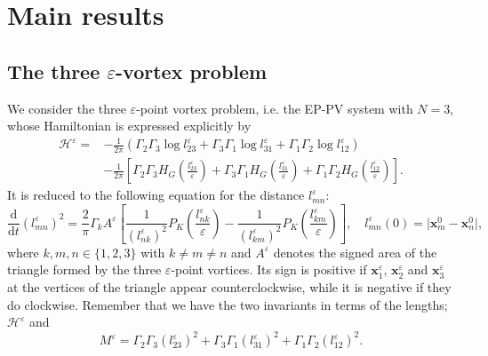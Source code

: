 \documentclass{article}
\theoremstyle{definition}
\begin{document}

\section{Main results}
\subsection{The three $\varepsilon$-vortex problem}
\label{three-vortex}

We consider the three $\varepsilon$-point vortex problem, i.e. the EP-PV system with $N=3$, whose Hamiltonian is expressed explicitly by
\begin{align*}
\mathscr{H}^\varepsilon = & -\frac{1}{2\pi} \left( \Gamma_2 \Gamma_3 \log l_{23}^\varepsilon + \Gamma_3 \Gamma_1 \log l_{31}^\varepsilon + \Gamma_1 \Gamma_2 \log l_{12}^\varepsilon \right) \\ 
& - \frac{1}{2\pi} \left[ \Gamma_2 \Gamma_3 H_G\left( \frac{l_{23}^\varepsilon}{\varepsilon} \right) + \Gamma_3 \Gamma_1 H_G\left( \frac{l_{31}^\varepsilon}{\varepsilon} \right) + \Gamma_1 \Gamma_2 H_G\left( \frac{l_{12}^\varepsilon}{\varepsilon} \right) \right].  
\end{align*}
It is reduced to the following equation for the distance $l_{mn}^\varepsilon$:
\begin{equation}
\frac{\mbox{d}}{\mbox{d}t} (l_{mn}^\varepsilon)^2 = \frac{2}{\pi} \Gamma_k A^\varepsilon \left[ \frac{1}{(l_{nk}^\varepsilon)^2} P_K \left( \frac{l_{nk}^\varepsilon}{\varepsilon} \right) - \frac{1}{(l_{km}^\varepsilon)^2} P_K \left( \frac{l_{km}^\varepsilon}{\varepsilon} \right) \right], \quad l_{mn}^\varepsilon(0) = \vert{\bm x}_m^0 - {\bm x}_n^0\vert, \label{l-EPPV}
\end{equation}
where $k, m, n \in \{ 1,2,3 \}$ with $k \neq m \neq n$ and $A^\varepsilon$ denotes the signed area of the triangle formed by the three $\varepsilon$-point vortices. Its sign is positive if ${\bm x}_1^\varepsilon$, ${\bm x}_2^\varepsilon$ and ${\bm x}_3^\varepsilon$ at the vertices of the triangle appear counterclockwise, while it is negative if they do clockwise. Remember that we have the two invariants in terms of the lengths;  $\mathscr{H}^\varepsilon$ and 
\begin{equation*}
M^\varepsilon = \Gamma_2 \Gamma_3 (l_{23}^\varepsilon)^2 + \Gamma_3 \Gamma_1 (l_{31}^\varepsilon)^2 + \Gamma_1 \Gamma_2 (l_{12}^\varepsilon)^2. 
\end{equation*}
\end{document}
